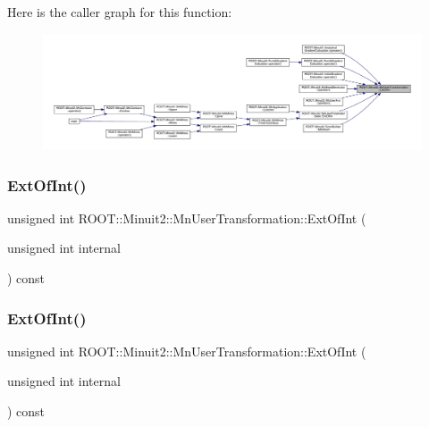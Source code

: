 Here is the caller graph for this function\+:
\nopagebreak
\begin{figure}[H]
\begin{center}
\leavevmode
\includegraphics[width=350pt]{d9/d98/classROOT_1_1Minuit2_1_1MnUserTransformation_a114bf6d4e97b6f8bf5f3788e30e63002_icgraph}
\end{center}
\end{figure}
\mbox{\label{classROOT_1_1Minuit2_1_1MnUserTransformation_a114bf6d4e97b6f8bf5f3788e30e63002}} 
\subsubsection{\texorpdfstring{ExtOfInt()}{ExtOfInt()}\hspace{0.1cm}{\footnotesize\ttfamily [2/3]}}
{\footnotesize\ttfamily unsigned int R\+O\+O\+T\+::\+Minuit2\+::\+Mn\+User\+Transformation\+::\+Ext\+Of\+Int (\begin{DoxyParamCaption}\item[{unsigned int}]{internal }\end{DoxyParamCaption}) const\hspace{0.3cm}{\ttfamily [inline]}}

\mbox{\label{classROOT_1_1Minuit2_1_1MnUserTransformation_a114bf6d4e97b6f8bf5f3788e30e63002}} 
\subsubsection{\texorpdfstring{ExtOfInt()}{ExtOfInt()}\hspace{0.1cm}{\footnotesize\ttfamily [3/3]}}
{\footnotesize\ttfamily unsigned int R\+O\+O\+T\+::\+Minuit2\+::\+Mn\+User\+Transformation\+::\+Ext\+Of\+Int (\begin{DoxyParamCaption}\item[{unsigned int}]{internal }\end{DoxyParamCaption}) const\hspace{0.3cm}{\ttfamily [inline]}}

